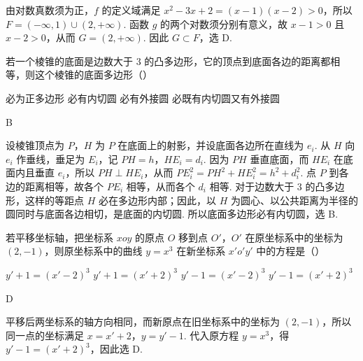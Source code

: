 \begin{solution}
由对数真数须为正，\(f\) 的定义域满足 \(x^2-3x+2=(x-1)(x-2)>0\)，所以 \(F=\left(-\infty,1\right)\cup\left(2,+\infty\right)\). 函数 \(g\) 的两个对数须分别有意义，故 \(x-1>0\) 且 \(x-2>0\)，从而 \(G=\left(2,+\infty\right)\). 因此 \(G\subset F\)，选 D.
\end{solution}

\begin{problem}

若一个棱锥的底面是边数大于 \(3\) 的凸多边形，它的顶点到底面各边的距离都相等，则这个棱锥的底面多边形（\quad）

\choices
    {必为正多边形}
    {必有内切圆}
    {必有外接圆}
    {必既有内切圆又有外接圆}

\begin{answer}
B
\end{answer}
\end{problem}

\begin{solution}
设棱锥顶点为 \(P\)，\(H\) 为 \(P\) 在底面上的射影，并设底面各边所在直线为 \(e_i\). 从 \(H\) 向 \(e_i\) 作垂线，垂足为 \(E_i\)，记 \(PH=h\)，\(HE_i=d_i\). 因为 \(PH\) 垂直底面，而 \(HE_i\) 在底面内且垂直 \(e_i\)，所以 \(PH\perp HE_i\)，从而 \(PE_i^2=PH^2+HE_i^2=h^2+d_i^2\). 点 \(P\) 到各边的距离相等，故各个 \(PE_i\) 相等，从而各个 \(d_i\) 相等. 对于边数大于 \(3\) 的凸多边形，这样的等距点 \(H\) 必在多边形内部；因此，以 \(H\) 为圆心、以公共距离为半径的圆同时与底面各边相切，是底面的内切圆. 所以底面多边形必有内切圆，选 B.
\end{solution}

\begin{problem}

若平移坐标轴，把坐标系 \(xoy\) 的原点 \(O\) 移到点 \(O'\)，\(O'\) 在原坐标系中的坐标为 \((2,-1)\)，则原坐标系中的曲线 \(y=x^3\) 在新坐标系 \(x'o'y'\) 中的方程是（\quad）

\choices
    {\(y'+1=\left(x'-2\right)^3\)}
    {\(y'+1=\left(x'+2\right)^3\)}
    {\(y'-1=\left(x'-2\right)^3\)}
    {\(y'-1=\left(x'+2\right)^3\)}

\begin{answer}
D
\end{answer}
\end{problem}

\begin{solution}
平移后两坐标系的轴方向相同，而新原点在旧坐标系中的坐标为 \((2,-1)\)，所以同一点的坐标满足 \(x=x'+2\)，\(y=y'-1\). 代入原方程 \(y=x^3\)，得 \(y'-1=\left(x'+2\right)^3\)，因此选 D.
\end{solution}


